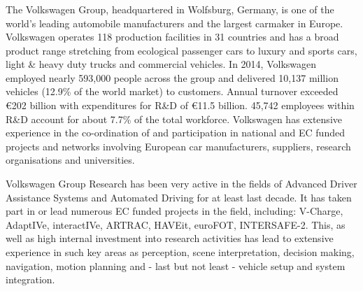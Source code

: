 \subsubsection{\VW}


The Volkswagen Group, headquartered in Wolfsburg, Germany, is one of the world's leading automobile manufacturers and the largest carmaker in Europe. Volkswagen operates 118 production facilities in 31 countries and has a broad product range stretching from ecological passenger cars to luxury and sports cars, light \& heavy duty trucks and commercial vehicles. In 2014, Volkswagen employed nearly 593,000 people across the group and delivered 10,137 million vehicles (12.9\% of the world market) to customers. Annual turnover exceeded \euro{}202 billion with expenditures for R\&D of \euro{}11.5 billion. 45,742 employees within R\&D account for about 7.7\% of the total workforce. Volkswagen has extensive experience in the co-ordination of and participation in national and EC funded projects and networks involving European car manufacturers, suppliers, research organisations and universities.

Volkswagen Group Research has been very active in the fields of Advanced Driver Assistance Systems and Automated Driving for at least last decade. It has taken part in or lead numerous EC funded projects in the field, including: V-Charge, AdaptIVe, interactIVe, ARTRAC, HAVEit, euroFOT, INTERSAFE-2. This, as well as high internal investment into research activities has lead to extensive experience in such key areas as perception, scene interpretation, decision making, navigation, motion planning and - last but not least - vehicle setup and system integration.


